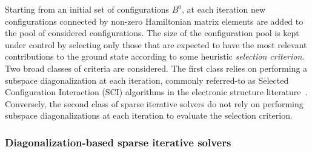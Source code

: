 \documentclass[
  reprint,            %
  amsmath,amssymb,
  aps,
  superscriptaddress, %
  longbibliography
]{revtex4-2}
\theoremstyle{definition}
\begin{document}
Starting from an initial set of configurations $B^0$, at each iteration new configurations connected by non-zero Hamiltonian matrix elements are added to the pool of considered configurations. The size of the configuration pool is kept under control by selecting only those that are expected to have the most relevant contributions to the ground state according to some heuristic \textit{selection criterion}. Two broad classes of criteria are considered. The first class relies on performing a subspace diagonalization at each iteration, commonly referred-to as Selected Configuration Interaction (SCI) algorithms in the electronic structure literature~\cite{holmes2016heat_SCI, zhang2025TrimCI_SCI, holmes2016efficient_SCI, tubman2016deterministic_SCI, sharma2017semistochastic_SCI, Huron_1973_CIPSI}. Conversely, the second class of sparse iterative solvers do not rely on performing subspace diagonalizations at each iteration to evaluate the selection criterion.


\subsubsection{Diagonalization-based sparse iterative solvers}
\label{ssapp:diagonalization_based}
\end{document}
